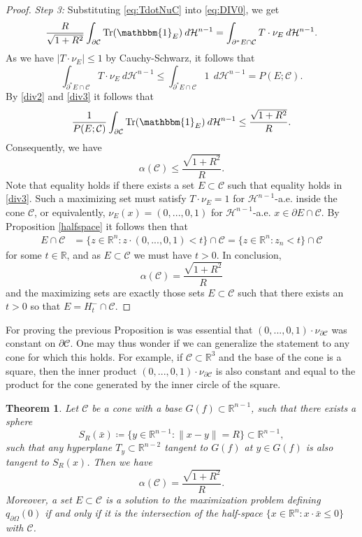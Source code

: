 \documentclass[artcle, 11pt, reqno]{amsart}
\numberwithin{equation}{section}
\newcommand{\R}{\mathbb{R}}
\newcommand{\Hd}{\mathcal{H}}
\newcommand{\pom}{{\partial \Omega}}
\newcommand{\ind}{\mathbbm{1}}
\newcommand{\C}{\mathcal{C}}
\newcommand{\dd}{\: d}
\DeclareMathOperator{\Tr}{Tr}
\theoremstyle{plain}
\newtheorem{theorem}{Theorem}
\theoremstyle{definition}
\theoremstyle{remark}
\begin{document}
\begin{proof}
		\textit{Step 3:} Substituting \eqref{eq:TdotNuC} into \eqref{eq:DIV0}, we get
		\begin{equation}
			\label{div2}
			\frac{R}{\sqrt{1+R^2}} \int_{\partial \C} \Tr(\ind_E) \dd\Hd^{n-1} = \int_{\partial^\ast E \cap \C} T\cdot \nu_E \dd\Hd^{n-1}.
		\end{equation}
		As we have $|T \cdot \nu_E| \leq 1$ by Cauchy-Schwarz, it follows that 
		\begin{equation}
			\label{div3}
			\int_{\partial^\ast E \cap \C} T\cdot \nu_E \dd\Hd^{n-1} \leq \int_{\partial^\ast E \cap \C} 1 \: \dd\Hd^{n-1} = P(E;\C).
		\end{equation}
		By \eqref{div2} and \eqref{div3} it follows that
		\begin{equation}
			\frac{1}{P(E;\C)}\int_{\partial \C} \Tr(\ind_E) \dd\Hd^{n-1}  \leq \frac{\sqrt{1+R^2}}{R}.
		\end{equation}
		Consequently, we have 
		\[ 
		\alpha(\C) \leq \frac{\sqrt{1+R^2}}{R}.
		\]
		Note that equality holds if there exists a set $E \subset \C$ such that equality holds in \eqref{div3}. Such a maximizing set must satisfy $T \cdot \nu_E = 1$ for $\Hd^{n-1}$-a.e. inside the cone $\C$, or equivalently, $\nu_E(x)=(0, ..., 0, 1)$ for $\Hd^{n-1}$-a.e. $x \in \partial E \cap \C$. 
		By Proposition \ref{halfspace} it follows then that 
		\begin{align*}
			E \cap \C &= \{ z \in \R^n : z \cdot (0,...,0,1) < t \} \cap \C = \{ z \in \R^n : z_n < t \} \cap \C
		\end{align*}
		for some $t \in \R$, and as $E \subset \C$ we must have $t>0$. 
		In conclusion, 
		\[
		\alpha(\C)=\frac{\sqrt{1+R^2}}{R}
		\]
		and the maximizing sets are exactly those sets $E \subset \C$ such that there exists an $t>0$ so that $E = H^-_t \cap \C$.
	\end{proof}
	
	For proving the previous Proposition is was essential that $(0,...,0,1)\cdot \nu_{\partial \C}$ was constant on $\partial \C$. One may thus wonder if we can generalize the statement to any cone for which this holds. For example, if $\C \subset \R^3$ and the base of the cone is a square, then the inner product $(0,...,0,1)\cdot \nu_{\partial \C}$ is also constant and equal to the product for the cone generated by the inner circle of the square. 
	
	\begin{theorem} \label{thm:Shapeswithinnercircle}
		Let $\C$ be a cone with a base $G(f) \subset \R^{n-1}$, such that there exists a sphere 
		\[
		S_R(\bar{x}) \coloneqq \{ y \in \R^{n-1} : \|x-y\| = R \} \subset \R^{n-1},
		\]
		such that any hyperplane $T_y \subset \R^{n-2}$ tangent to $G(f)$ at $y \in G(f)$ is also tangent to $S_R(x)$. Then we have 
		\[
		\alpha(\C)=\frac{\sqrt{1+R^2}}{R}.
		\]
		Moreover, a set $E\subset\C$ is a solution to the maximization problem defining $q_\pom(0)$ if and only if it is the intersection of the half-space $\{x\in\R^n : x\cdot \bar{x} \leq 0\}$ with $\C$.
	\end{theorem}
	
\end{document}
